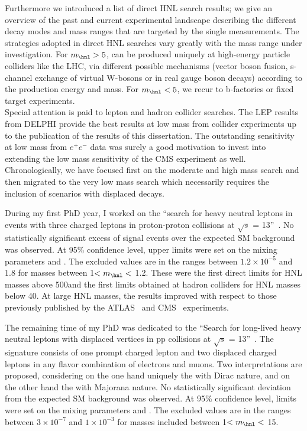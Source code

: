 Furthermore we introduced a list of direct HNL search results; we give an overview
of the past and current experimental landscape describing the different decay modes and
mass ranges that are targeted by the single measurements.
The strategies adopted in direct HNL searches vary greatly with the mass range under investigation. For $m_{\hnl} > 5$\GeV, \hnl can be
produced uniquely at high-energy particle colliders like the LHC, via
different possible 
mechanisms (vector boson fusion, s-channel exchange of virtual
W-bosons or in real gauge boson decays) according to the production
energy and \hnl mass. For $m_{\hnl} < 5$\GeV, we recur to b-factories
or fixed target experiments. \\
Special attention is paid to lepton and hadron collider
searches. The LEP results from DELPHI provide the best results at low mass from collider experiments up to the publication of the results
of this dissertation. The outstanding sensitivity at low mass from
$e^{+}e^{-}$ data was surely a good motivation to invest into extending the low mass sensitivity of
the CMS experiment as well.\\

Chronologically, we have focused first on the
moderate and high mass search and then migrated to the very low mass search which
necessarily requires the inclusion of scenarios with displaced decays.

During my first PhD year, I worked on the ``search for heavy neutral leptons in events with three charged
 leptons in proton-proton collisions at $\sqrt{s}$ =
 13\TeV''~\cite{Sirunyan:2018mtv}. No 
 statistically significant excess of signal events over the expected
SM background was observed. At 95\% confidence level, upper limits were set on the mixing
parameters \mixpare and \mixparm. The excluded values are in the
ranges between $1.2\times 10^{-5}$ and $1.8$ for masses 
between 1\GeV $< m_\hnl <$ 1.2\TeV. 
These were the first direct limits for HNL masses above 500\GeV and the first
limits obtained at hadron colliders for HNL masses below 40\GeV.
At large HNL masses, the results improved with respect to those previously published
by the ATLAS~\cite{Aad_2015} and CMS~\cite{Khachatryan_2015,Sirunyan:2018xiv}
experiments. 

The remaining time of my PhD was dedicated to the ``Search for long-lived heavy neutral leptons with displaced
vertices in pp collisions at $\sqrt{s}$ =
 13\TeV''~\cite{CMS-PAS-EXO-20-009}.
The signature consists of one prompt charged lepton and two displaced
charged leptons in any flavor combination of electrons
and muons. Two interpretations are proposed, considering
on the one hand uniquely the \hnl with 
Dirac nature, and on the other hand the \hnl with Majorana nature. 
No statistically significant deviation from the expected
SM background was observed. At 95\% confidence level, limits were set on the mixing
parameters \mixpare and \mixparm.
The excluded values are in the
ranges between $3\times 10^{-7}$ and $1\times 10^{-3}$ for masses included
between 1\GeV $< m_\hnl <$ 15\GeV. \\

